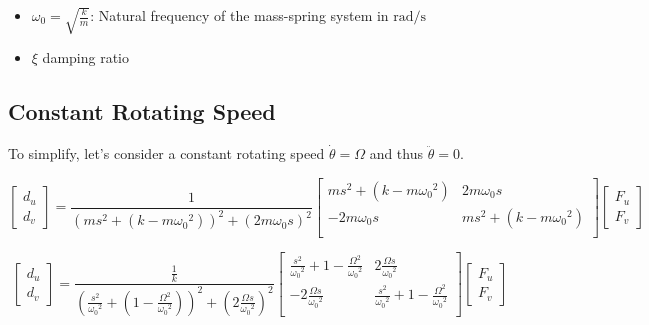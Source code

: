 \documentclass{ISMA_USD2020}
\begin{document}
\begin{itemize}
\item \(\omega_0 = \sqrt{\frac{k}{m}}\): Natural frequency of the mass-spring system in \(\si{\radian/\s}\)
\item \(\xi\) damping ratio
\end{itemize}


\subsection{Constant Rotating Speed}
\label{sec:org8d2eda6}
To simplify, let's consider a constant rotating speed \(\dot{\theta} = \Omega\) and thus \(\ddot{\theta} = 0\).

\begin{equation}
\label{eq:coupledplant}
\begin{bmatrix} d_u \\ d_v \end{bmatrix} =
\frac{1}{(m s^2 + (k - m{\omega_0}^2))^2 + (2 m {\omega_0} s)^2}
\begin{bmatrix}
  ms^2 + (k-m{\omega_0}^2) & 2 m \omega_0 s \\
  -2 m \omega_0 s          & ms^2 + (k-m{\omega_0}^2) \\
\end{bmatrix}
\begin{bmatrix} F_u \\ F_v \end{bmatrix}
\end{equation}

\begin{equation}
\label{eq:coupled_plant}
\begin{bmatrix} d_u \\ d_v \end{bmatrix} =
\frac{\frac{1}{k}}{\left( \frac{s^2}{{\omega_0}^2} + (1 - \frac{{\Omega}^2}{{\omega_0}^2}) \right)^2 + \left( 2 \frac{{\Omega} s}{{\omega_0}^2} \right)^2}
\begin{bmatrix}
  \frac{s^2}{{\omega_0}^2} + 1 - \frac{{\Omega}^2}{{\omega_0}^2} & 2 \frac{\Omega s}{{\omega_0}^2} \\
  -2 \frac{\Omega s}{{\omega_0}^2}          & \frac{s^2}{{\omega_0}^2} + 1 - \frac{{\Omega}^2}{{\omega_0}^2} \\
\end{bmatrix}
\begin{bmatrix} F_u \\ F_v \end{bmatrix}
\end{equation}
\end{document}
